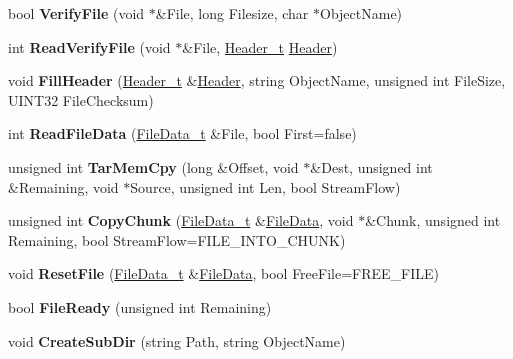 \begin{DoxyCompactItemize}
\item 
\hypertarget{class_c_tar_a67ddb380fb3a80e3fa8742be1b24c931}{
bool {\bfseries VerifyFile} (void $\ast$\&File, long Filesize, char $\ast$ObjectName)}
\label{class_c_tar_a67ddb380fb3a80e3fa8742be1b24c931}

\item 
\hypertarget{class_c_tar_abda0c27ddb29c1440a4635c5b53e8656}{
int {\bfseries ReadVerifyFile} (void $\ast$\&File, \hyperlink{struct_header}{Header\_\-t} \hyperlink{struct_header}{Header})}
\label{class_c_tar_abda0c27ddb29c1440a4635c5b53e8656}

\item 
\hypertarget{class_c_tar_a5fb201d240464f33f02ca138852da619}{
void {\bfseries FillHeader} (\hyperlink{struct_header}{Header\_\-t} \&\hyperlink{struct_header}{Header}, string ObjectName, unsigned int FileSize, UINT32 FileChecksum)}
\label{class_c_tar_a5fb201d240464f33f02ca138852da619}

\item 
\hypertarget{class_c_tar_a9bd167ec1dfc8b9e11c15f29c20c9287}{
int {\bfseries ReadFileData} (\hyperlink{struct_file_data}{FileData\_\-t} \&File, bool First=false)}
\label{class_c_tar_a9bd167ec1dfc8b9e11c15f29c20c9287}

\item 
\hypertarget{class_c_tar_a594e6d5fec979606a4dbc1d8ef3c3fc7}{
unsigned int {\bfseries TarMemCpy} (long \&Offset, void $\ast$\&Dest, unsigned int \&Remaining, void $\ast$Source, unsigned int Len, bool StreamFlow)}
\label{class_c_tar_a594e6d5fec979606a4dbc1d8ef3c3fc7}

\item 
\hypertarget{class_c_tar_a2214c4d96e83e2f905164ad2d7dc9acf}{
unsigned int {\bfseries CopyChunk} (\hyperlink{struct_file_data}{FileData\_\-t} \&\hyperlink{struct_file_data}{FileData}, void $\ast$\&Chunk, unsigned int Remaining, bool StreamFlow=FILE\_\-INTO\_\-CHUNK)}
\label{class_c_tar_a2214c4d96e83e2f905164ad2d7dc9acf}

\item 
\hypertarget{class_c_tar_af1dca590228891b902ea282e9e20a9d8}{
void {\bfseries ResetFile} (\hyperlink{struct_file_data}{FileData\_\-t} \&\hyperlink{struct_file_data}{FileData}, bool FreeFile=FREE\_\-FILE)}
\label{class_c_tar_af1dca590228891b902ea282e9e20a9d8}

\item 
\hypertarget{class_c_tar_aa4eb1b409db6a2ff858280e054de60db}{
bool {\bfseries FileReady} (unsigned int Remaining)}
\label{class_c_tar_aa4eb1b409db6a2ff858280e054de60db}

\item 
\hypertarget{class_c_tar_a4254585dd5208c1b965091d008b0533c}{
void {\bfseries CreateSubDir} (string Path, string ObjectName)}
\label{class_c_tar_a4254585dd5208c1b965091d008b0533c}

\end{DoxyCompactItemize}
